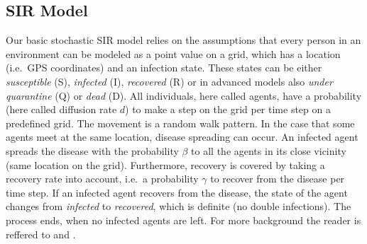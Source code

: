 \subsection{SIR Model}
Our basic stochastic SIR model relies on the assumptions that every person in an environment can be modeled as a point value on a grid, which has a location (i.e.\ GPS coordinates) and an infection state. These states can be either \textit{susceptible} (S), \textit{infected} (I), \textit{recovered} (R) or in advanced models also \textit{under quarantine} (Q) or \textit{dead} (D). All individuals, here called agents, have a probability (here called diffusion rate $d$) to make a step on the grid per time step on a predefined grid. The movement is a random walk pattern. In the case that some agents meet at the same location, disease spreading can occur. An infected agent spreads the disease with the probability $\beta$ to all the agents in its close vicinity (same location on the grid). Furthermore, recovery is covered by taking a recovery rate into account, i.e.\ a probability $\gamma$ to recover from the disease per time step. If an infected agent recovers from the disease, the state of the agent changes from \textit{infected} to \textit{recovered}, which is definite (no double infections). The process ends, when no infected agents are left. For more background the reader is reffered to \cite{weiss2013sir} and \cite{epstein2009modelling}.

